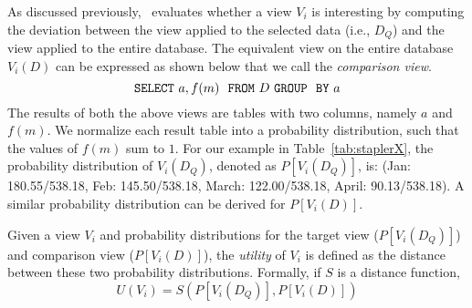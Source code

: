 As discussed previously, \VizRecDB\ evaluates
whether a view $V_i$ is interesting
by computing the deviation between the view applied to the selected data (i.e., $D_Q$) 
and the view applied to the entire database.
The equivalent view on the entire database $V_i (D)$ can be expressed as shown
below that we call the {\em comparison view}. 
$${\tt SELECT \ } a, f(m) \ \ {\tt FROM} \  D\  {\tt GROUP \ \ BY} \ a$$
The results of both the above views are tables with two columns, namely $a$ and
$f(m)$. We normalize each result table into a probability distribution, such
that the values of $f(m)$ sum to $1$.
For our example in Table~\ref{tab:staplerX}, the probability distribution of
$V_i(D_Q)$, denoted as $P[V_i (D_Q)]$, is: (Jan: 180.55/538.18, Feb:
145.50/538.18, March: 122.00/538.18,  April: 90.13/538.18). 
A similar
probability distribution can be derived for $P[V_i (D)]$.

Given a view $V_i$ and probability distributions for the
target view  ($P[V_i (D_Q)]$) and comparison view ($P[V_i (D)]$), the
{\em utility} of $V_i$ is defined as the distance between these two probability
distributions. Formally, if $S$ is a distance function,
$$ U (V_i) = S ( P[V_i (D_Q)], P[V_i (D)] )$$

